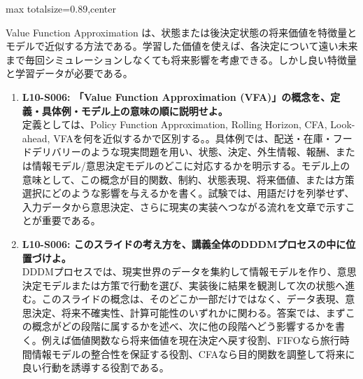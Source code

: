 \begin{minipage}[t]{0.58\textwidth}
\begin{adjustbox}{max totalsize={\textwidth}{0.89\textheight},center}
\begin{minipage}{\textwidth}
Value Function Approximation は、状態または後決定状態の将来価値を特徴量とモデルで近似する方法である。学習した価値を使えば、各決定について遠い未来まで毎回シミュレーションしなくても将来影響を考慮できる。しかし良い特徴量と学習データが必要である。\par{}\begin{enumerate}\item \textbf{L10-S006: 「Value Function Approximation (VFA)」の概念を、定義・具体例・モデル上の意味の順に説明せよ。}\\定義としては、Policy Function Approximation, Rolling Horizon, CFA, Look-ahead, VFAを何を近似するかで区別する。。具体例では、配送・在庫・フードデリバリーのような現実問題を用い、状態、決定、外生情報、報酬、または情報モデル/意思決定モデルのどこに対応するかを明示する。モデル上の意味として、この概念が目的関数、制約、状態表現、将来価値、または方策選択にどのような影響を与えるかを書く。試験では、用語だけを列挙せず、入力データから意思決定、さらに現実の実装へつながる流れを文章で示すことが重要である。\item \textbf{L10-S006: このスライドの考え方を、講義全体のDDDMプロセスの中に位置づけよ。}\\DDDMプロセスでは、現実世界のデータを集約して情報モデルを作り、意思決定モデルまたは方策で行動を選び、実装後に結果を観測して次の状態へ進む。このスライドの概念は、そのどこか一部だけではなく、データ表現、意思決定、将来不確実性、計算可能性のいずれかに関わる。答案では、まずこの概念がどの段階に属するかを述べ、次に他の段階へどう影響するかを書く。例えば価値関数なら将来価値を現在決定へ戻す役割、FIFOなら旅行時間情報モデルの整合性を保証する役割、CFAなら目的関数を調整して将来に良い行動を誘導する役割である。\end{enumerate}
\end{minipage}
\end{adjustbox}
\end{minipage}


